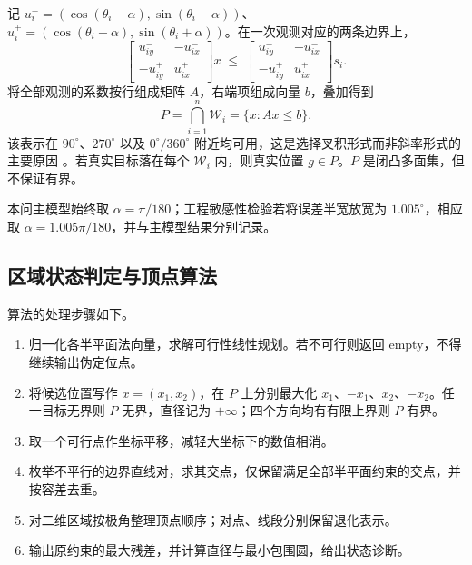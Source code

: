 \documentclass[UTF8,a4paper,zihao=-4,fontset=none]{ctexart}
\begin{document}
记 \(u_i^-=(\cos(\theta_i-\alpha),\sin(\theta_i-\alpha))\)、\(u_i^+=(\cos(\theta_i+\alpha),\sin(\theta_i+\alpha))\)。在一次观测对应的两条边界上，
\begin{equation}
  \begin{bmatrix}u_{iy}^- & -u_{ix}^-\\[2pt] -u_{iy}^+ & u_{ix}^+\end{bmatrix}x
  \;\le\;
  \begin{bmatrix}u_{iy}^- & -u_{ix}^-\\[2pt] -u_{iy}^+ & u_{ix}^+\end{bmatrix}s_i .
  \label{eq:halfplane}
\end{equation}
将全部观测的系数按行组成矩阵 \(A\)，右端项组成向量 \(b\)，叠加得到
\begin{equation}
  P=\bigcap_{i=1}^{n}\mathcal W_i=\{x:Ax\le b\}.
  \label{eq:P}
\end{equation}
该表示在 \(90^\circ\)、\(270^\circ\) 以及 \(0^\circ/360^\circ\) 附近均可用，这是选择叉积形式而非斜率形式的主要原因 \cite{Tokekar2013}。若真实目标落在每个 \(\mathcal W_i\) 内，则真实位置 \(g\in P\)。\(P\) 是闭凸多面集，但不保证有界。

本问主模型始终取 \(\alpha=\pi/180\)；工程敏感性检验若将误差半宽放宽为 \(1.005^\circ\)，相应取 \(\alpha=1.005\pi/180\)，并与主模型结果分别记录。

\subsection{区域状态判定与顶点算法}

算法的处理步骤如下。

\begin{enumerate}[label=(\arabic*),leftmargin=2.2em]
  \item 归一化各半平面法向量，求解可行性线性规划。若不可行则返回 empty，不得继续输出伪定位点。
  \item 将候选位置写作 \(x=(x_1,x_2)\)，在 \(P\) 上分别最大化 \(x_1\)、\(-x_1\)、\(x_2\)、\(-x_2\)。任一目标无界则 \(P\) 无界，直径记为 \(+\infty\)；四个方向均有有限上界则 \(P\) 有界。
  \item 取一个可行点作坐标平移，减轻大坐标下的数值相消。
  \item 枚举不平行的边界直线对，求其交点，仅保留满足全部半平面约束的交点，并按容差去重。
  \item 对二维区域按极角整理顶点顺序；对点、线段分别保留退化表示。
  \item 输出原约束的最大残差，并计算直径与最小包围圆，给出状态诊断。
\end{enumerate}
\end{document}
